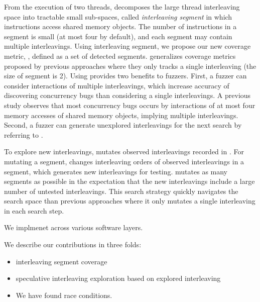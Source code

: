  From the execution of two threads,  
\sys decomposes the large thread interleaving space into tractable 
small sub-spaces, called \textit{interleaving segment} in which
instructions access shared memory objects. The number of instructions 
in a segment is small (at most four by default), and each segment may 
contain multiple interleavings. Using interleaving segment, we propose 
our new coverage metric, \textit{\intcov}, defined as a set of detected segments. \Intcov generalizes coverage 
metrics proposed by previous approaches where they only tracks 
a single interleaving (the size of segment is 2). 
Using \intcov provides two benefits to fuzzers. First, a fuzzer can 
consider interactions of multiple interleavings, which increase 
accuracy of discovering concurrency bugs than considering a single 
interleavings. A previous study\cite{learningfrommistakes} observes that
most concurrency bugs occurs by interactions of at most four memory accesses of shared memory objects, implying multiple interleavings.
Second, a fuzzer can generate unexplored interleavings for the next 
search by referring to \intcov.

 To explore new interleavings,
\sys mutates observed interleavings recorded in \intcov. For mutating a segment, \sys changes interleaving orders of observed interleavings 
in a segment, which generates new interleavings for testing. \sys 
mutates as many segments as possible in the expectation that the 
new interleavings include a large number of untested interleavings. 
This search strategy quickly navigates the search space than previous 
approaches where it only mutates a single interleaving in each search step.



We implmenet \sys across various software layers.




We describe our contributions in three folds:

\begin{itemize}
\item interleaving segment coverage
\item speculative interleaving exploration based on explored interleaving
\item We have found \totalbugs race conditions.
\end{itemize}

